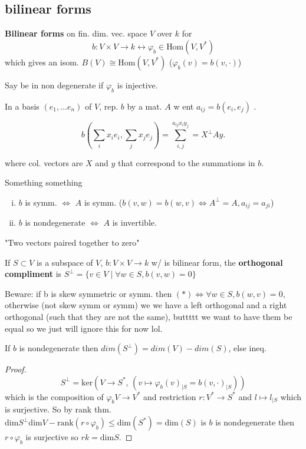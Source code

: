\documentclass[12pt,oneside]{report}
\begin{document}
%

\subsection{bilinear forms}

\textbf{Bilinear forms} on fin. dim. vec. space \( V \) over \( k \) for
\[ b: V \times  V \to k \longleftrightarrow  \varphi _b \in  \text{Hom}(V,V^*)\]
which gives an isom. \( B(V) \cong \text{Hom}(V,V^*) \) (\( \varphi  _b (v)=b(v,\cdot) \))

Say be in non degenerate if \( \varphi_b  \) is injective. 

In a basis \( (e_{1},\ldots e_n) \) of \( V \), rep. \( b \) by a mat. \( A \) w ent \( a_{ij}=b(e_i,e_j) \) .

\[
  b(\sum_i x_ie_i,\sum_jx_je_j) = \displaystyle\sum_{i,j}^{ a_{ij}x_iy_j}=X^{\perp}Ay
.\] 

where col. vectors are \( X \) and \( y \) that correspond to the summations in \( b \). 


Something something
\begin{enumerate}[i.]
  \item \( b \) is symm. \( \iff \) \( A \) is symm. (\( b(v,w)=b(w,v) \iff A^{\perp}=A, a_{ij}=a_{ji} \))
  \item \( b \) is nondegenerate \( \iff \) \( A \) is invertible. 
\end{enumerate}


 "Two vectors paired together to zero"

\begin{definition}[Orthogonality]
  If \( S \subset V \) is a subspace of \( V \), \( b:V\times V \to k \) w/ is bilinear form, the \textbf{orthogonal compliment} is \( S^{\perp}=\{v \in  V \mid  \forall w \in  S, b(v,w)=0 \} \)
\end{definition}

Beware: if b is skew symmetric or symm. then \( (*)\iff \forall w \in  S, b(w,v)=0 \), otherwise (not skew symm or symm) we we have a left orthogonal and a right orthogonal (such that they are not the same), buttttt we want to have them be equal so we just will ignore this for now lol. 

\begin{lemma}
  If \( b \) is nondegenerate then \( dim(S^{\perp})=dim(V)-dim(S) \), else ineq. 
\end{lemma}

\begin{proof}
  
  \begin{displaymath}
    S^{\perp}=      \text{ker} \left( V \to  S^*, \, (v \mapsto \varphi _b(v)_{\mid S} =b(v,\cdot)_{\mid S}) \right)
  \end{displaymath}
  which is the composition of \( \varphi _b V \to  V^* \) and restriction \( r: V^* \to  S^* \) and \( l\mapsto l_{\mid S} \) which is surjective. So by rank thm. \( \text{dim}S^{\perp} \text{dim}V-\text{rank}(r \circ \varphi _b ) \le \text{dim}(S^*)=\text{dim}(S) \) is \( b  \) is nondegenerate then \( r \circ \varphi _b \) is surjective so \( rk=\text{dim}S \).
\end{proof}
\end{document}
